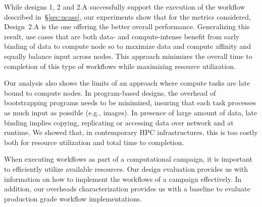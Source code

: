 While designs 1, 2 and 2.A successfully support the execution of the workflow
described in~\S\ref{sec:ucase}, our experiments show that for the metrics
considered, Design~2.A is the one offering the better overall performance.
Generalizing this result, use cases that are both data- and
compute-intense benefit from early binding of data to compute node so to
maximize data and compute affinity and equally balance input across nodes. This
approach minimizes the overall time to completion of this type of workflows
while maximizing resource utilization.

Our analysis also shows the limits of an approach where compute tasks are late
bound to compute nodes. In program-based designs, the overhead of bootstrapping
programs needs to be minimized, insuring that each task processes as much
input as possible (e.g., images). In presence of large amount of data, late
binding implies copying, replicating or accessing data over network and at
runtime. We showed that, in contemporary HPC infrastructures, this is too costly
both for resource utilization and total time to completion.

When executing workflows as part of a computational campaign, it is important
to efficiently utilize available resources. Our design evaluation provides us
with information on how to implement the workflows of a campaign effectively.
In addition, our overheads characterization provides us with a baseline to
evaluate production grade workflow implementations.